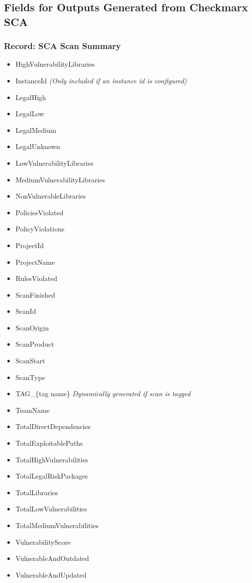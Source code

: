 \subsection{Fields for Outputs Generated from Checkmarx SCA}


\subsubsection{Record: SCA Scan Summary}

\begin{itemize}

    \item HighVulnerabilityLibraries
    \item InstanceId \textit{(Only included if an instance id is configured)}
    \item LegalHigh
    \item LegalLow
    \item LegalMedium
    \item LegalUnknown
    \item LowVulnerabilityLibraries
    \item MediumVulnerabilityLibraries
    \item NonVulnerableLibraries
    \item PoliciesViolated
    \item PolicyViolations
    \item ProjectId
    \item ProjectName
    \item RulesViolated
    \item ScanFinished
    \item ScanId
    \item ScanOrigin
    \item ScanProduct
    \item ScanStart
    \item ScanType
    \item TAG\_\{tag name\} \textit{Dynamically generated if scan is tagged}
    \item TeamName
    \item TotalDirectDependencies
    \item TotalExploitablePaths
    \item TotalHighVulnerabilities
    \item TotalLegalRiskPackages
    \item TotalLibraries
    \item TotalLowVulnerabilities
    \item TotalMediumVulnerabilities
    \item VulnerabilityScore
    \item VulnerableAndOutdated
    \item VulnerableAndUpdated
\end{itemize}


